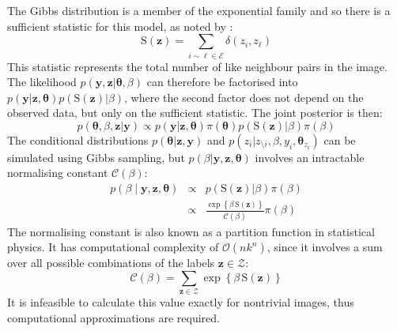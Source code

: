 \documentclass[nojss,shortnames]{jss}\usepackage[]{graphicx}\usepackage[]{color}
\begin{document}
The Gibbs distribution is a member of the exponential family and so there is a sufficient statistic for this model, as noted by \citet{Grelaud2009}:
  \begin{equation}
  \label{eq:potts_stat}
\mathrm{S}(\mathbf{z}) = \sum_{i \sim \ell \in \mathcal{E}} \delta(z_i,z_\ell)
  \end{equation}
This statistic represents the total number of like neighbour pairs in the image. The likelihood $p(\mathbf{y},\mathbf{z} | \boldsymbol\theta, \beta)$ can therefore be factorised into $p(\mathbf{y} | \mathbf{z}, \boldsymbol\theta) p(\mathrm{S}(\mathbf{z}) | \beta)$, where the second factor does not depend on the observed data, but only on the sufficient statistic. The joint posterior is then:
\begin{equation}
\label{eq:joint_post}
p(\boldsymbol\theta, \beta, \mathbf{z} | \mathbf{y}) \propto p(\mathbf{y} | \mathbf{z}, \boldsymbol\theta) \pi(\boldsymbol\theta) p(\mathrm{S}(\mathbf{z}) | \beta) \pi(\beta)
\end{equation}
The conditional distributions $p(\boldsymbol\theta | \mathbf{z}, \mathbf{y})$ and $p(z_i | z_{\setminus i}, \beta, y_i, \boldsymbol\theta_{z_i})$ can be simulated using Gibbs sampling, but $p(\beta | \mathbf{y}, \mathbf{z}, \boldsymbol\theta)$ involves an intractable normalising constant $\mathcal{C}(\beta)$:
  \begin{eqnarray}
  \label{eq:beta_post}
  p(\beta \mid \mathbf{y}, \mathbf{z}, \boldsymbol\theta) &\propto&  p(\mathrm{S}(\mathbf{z}) | \beta) \pi(\beta)\\
  \label{eq:beta}
 &\propto& \frac{\exp\left\{ \beta\, \mathrm{S}(\mathbf{z}) \right\}}{\mathcal{C}(\beta)} \pi(\beta)
  \end{eqnarray}
The normalising constant is also known as a partition function in statistical physics. It has computational complexity of $\mathcal{O}(n k^n)$, since it involves a sum over all possible combinations of the labels $\mathbf{z} \in \mathcal{Z}$:
  \begin{equation}
  \label{eq:norm}
\mathcal{C}(\beta) = \sum_{\mathbf{z} \in \mathcal{Z}} \exp\left\{\beta\, \mathrm{S}(\mathbf{z})\right\}
  \end{equation}
It is infeasible to calculate this value exactly for nontrivial images, thus computational approximations are required.
\end{document}
